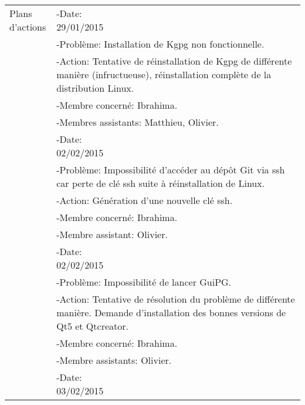 \documentclass{../res/univ-projet}
\begin{document}
\begin{tabular}{| p{5cm} | p{2.5cm} | p{6.5cm} |}
		\cellcolor{lightgray}Plans d'actions  & \multicolumn{2}{p{9cm}|}{-Date: 29/01/2015~~~~~~~~~~~~~~~~~~~~~~~~~~~~~~~~~~~~~~} \\
		\cellcolor{lightgray}					       & \multicolumn{2}{p{9cm}|}{-Problème: Installation de Kgpg non fonctionnelle.} \\
		\cellcolor{lightgray}					       & \multicolumn{2}{p{9cm}|}{-Action: Tentative de réinstallation de Kgpg de différente manière (infructueuse), réinstallation complète de la distribution Linux.} \\
		\cellcolor{lightgray}					       & \multicolumn{2}{p{9cm}|}{-Membre concerné: Ibrahima.} \\
		\cellcolor{lightgray}						   & \multicolumn{2}{p{9cm}|}{-Membres assistants: Matthieu, Olivier.} \\ \cline{2-3}
		\cellcolor{lightgray}						   & \multicolumn{2}{p{9cm}|}{-Date: 02/02/2015~~~~~~~~~~~~~~~~~~~~~~~~~~~~~~~~~~~~~~} \\
		\cellcolor{lightgray}						   & \multicolumn{2}{p{9cm}|}{-Problème: Impossibilité d'accéder au dépôt Git via ssh car perte de clé ssh suite à réinstallation de Linux.} \\
		\cellcolor{lightgray}						   & \multicolumn{2}{p{9cm}|}{-Action: Génération d'une nouvelle clé ssh.} \\
		\cellcolor{lightgray}						   & \multicolumn{2}{p{9cm}|}{-Membre concerné: Ibrahima.} \\
		\cellcolor{lightgray}						   & \multicolumn{2}{p{9cm}|}{-Membre assistant: Olivier.} \\ \cline{2-3}
		\cellcolor{lightgray}						   & \multicolumn{2}{p{9cm}|}{-Date: 02/02/2015~~~~~~~~~~~~~~~~~~~~~~~~~~~~~~~~~~~~~~} \\
		\cellcolor{lightgray}						   & \multicolumn{2}{p{9cm}|}{-Problème: Impossibilité de lancer GuiPG.} \\
		\cellcolor{lightgray}						   & \multicolumn{2}{p{9cm}|}{-Action: Tentative de résolution du problème de différente manière. Demande d'installation des bonnes versions de Qt5 et Qtcreator.} \\
		\cellcolor{lightgray}						   & \multicolumn{2}{p{9cm}|}{-Membre concerné: Ibrahima.} \\
		\cellcolor{lightgray}						   & \multicolumn{2}{p{9cm}|}{-Membre assistants: Olivier.} \\ \cline{2-3}
		\cellcolor{lightgray}						   & \multicolumn{2}{p{9cm}|}{-Date: 03/02/2015~~~~~~~~~~~~~~~~~~~~~~~~~~~~~~~~~~~~~~} \\

\end{tabular}
\end{document}
